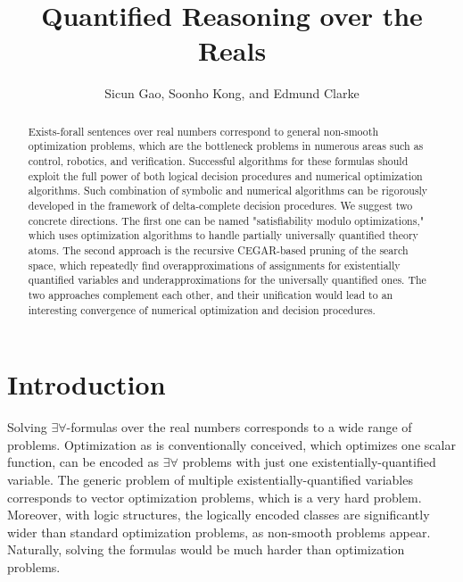 \documentclass{llncs}
\title{Quantified Reasoning over the Reals}
\author{Sicun Gao, Soonho Kong, and Edmund Clarke}
\begin{document}
\maketitle

\begin{abstract}
Exists-forall sentences over real numbers correspond to general non-smooth optimization problems, which are the bottleneck problems in numerous areas such as control, robotics, and
verification. Successful algorithms for these formulas should exploit
the full power of both logical decision procedures and numerical
optimization algorithms. Such combination of symbolic and numerical
algorithms can be rigorously developed in the framework of
delta-complete decision procedures. We suggest two concrete
directions. The first one can be named "satisfiability modulo
optimizations," which uses optimization algorithms to handle partially
universally quantified theory atoms. The second approach is the
recursive CEGAR-based pruning of the search space, which repeatedly
find overapproximations of assignments for existentially quantified
variables and underapproximations for the universally quantified ones.
The two approaches complement each other, and their unification would
lead to an interesting convergence of numerical optimization and
decision procedures.
\end{abstract}

\section{Introduction}

Solving $\exists\forall$-formulas over the real numbers corresponds to a wide range of problems. Optimization as is conventionally conceived, which optimizes one scalar function, can be encoded as $\exists\forall$ problems with just one existentially-quantified variable. The generic problem of multiple existentially-quantified variables corresponds to vector optimization problems, which is a very hard problem. Moreover, with logic structures, the logically encoded classes are significantly wider than standard optimization problems, as non-smooth problems appear. Naturally, solving the formulas would be much harder than optimization problems. 
\end{document}
